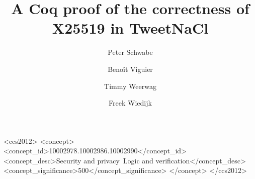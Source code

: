 \documentclass[format=sigconf, screen=true, review=false, authordraft=true]{acmart}
\newif\ifpublic
\begin{document}
\begin{CCSXML}
<ccs2012>
<concept>
<concept_id>10002978.10002986.10002990</concept_id>
<concept_desc>Security and privacy~Logic and verification</concept_desc>
<concept_significance>500</concept_significance>
</concept>
</ccs2012>
\end{CCSXML}





\date{}

\title{\Large \bf A Coq proof of the correctness of X25519 in TweetNaCl}

\author{Peter Schwabe}
\author{Beno\^it Viguier}
\author{Timmy Weerwag}
\author{Freek Wiedijk}



\maketitle





\vspace*{1cm}
{
}

\begin{appendix}
\end{appendix}
\end{document}
